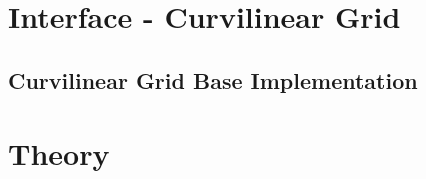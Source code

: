 \documentclass[12pt]{report}
\begin{document}












\chapter{Interface - Curvilinear Grid}



\section{Curvilinear Grid Base Implementation}


















\chapter{Theory}


\end{document}

